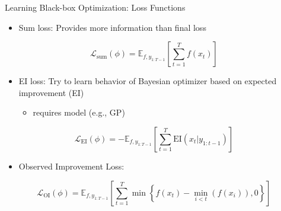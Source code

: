 \begin{frame}[c]{Learning Black-box Optimization: Loss Functions\newline {}}

\begin{itemize}
  \item Sum loss: Provides more information than final loss
\end{itemize}
\begin{equation}
\mathcal{L}_{\text{sum}}(\phi) = \mathbb{E}_{f,y_{1:T-1}}\left[\sum_{t=1}^T f(x_t)\right]\nonumber
\end{equation}

\pause

\begin{itemize}
  \item EI loss: Try to learn behavior of Bayesian optimizer based on expected improvement (EI)
  \begin{itemize}
    \item requires model (e.g., GP)
  \end{itemize}
\end{itemize}
\begin{equation}
\mathcal{L}_{\text{EI}}(\phi) = - \mathbb{E}_{f,y_{1:T-1}}\left[\sum_{t=1}^T \text{EI}(x_t | y_{1:t-1})\right]\nonumber
\end{equation}

\pause

\begin{itemize}
  \item Observed Improvement Loss:
\end{itemize}

\begin{equation}
\mathcal{L}_{\text{OI}}(\phi) = \mathbb{E}_{f,y_{1:T-1}}\left[\sum_{t=1}^T \min \left\{f(x_t) - \min_{i<t}(f(x_i)),0 \right\}  \right]\nonumber
\end{equation}

\end{frame}
